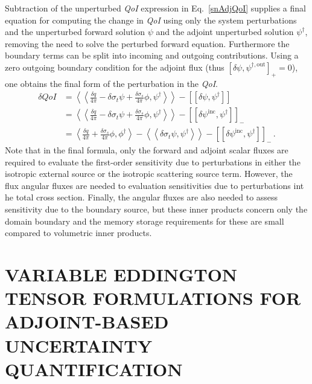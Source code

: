 \documentclass[12pt]{report}
\newcommand{\bra}{\left\langle}
\newcommand{\ket}{\right\rangle}
\newcommand{\braSN}{\left\langle \! \left\langle}
\newcommand{\ketSN}{\right\rangle \! \right\rangle}
\newcommand{\sbraSN}{\left[ \! \left[}
\newcommand{\sketSN}{\right] \! \right]}
\newcommand{\sbra}{\left[}
\newcommand{\sket}{\right]}
\newcommand{\sigt}{\sigma_t}
\newcommand{\sigs}{\sigma_s}
\newcommand{\angSourced}{\frac{\delta q}{4 \pi}}
\newcommand{\qoi}{{\it QoI}\xspace}
\begin{document}
Subtraction of the unperturbed \qoi expression in Eq.~\eqref{snAdjQoI} supplies a final equation for computing the change in \qoi using only the system perturbations and the unperturbed forward solution $\psi$ and the adjoint unperturbed
solution $\psi^\dag$, removing the need to solve the perturbed forward equation. 
Furthermore the boundary terms can be split into incoming and outgoing contributions.
Using a zero outgoing boundary condition for the adjoint flux
(thus $\sbra \delta \psi, \psi^{\dag,\text{out}} \sket_+=0$), one obtains the final 
form of the perturbation in the \qoi.
\begin{equation}
\label{snSens}
\begin{split}
\delta QoI &= \braSN \frac{\delta q}{4\pi} - \delta \sigt \psi + \frac{\delta\sigs}{4 \pi} \phi  , \psi^\dag  \ketSN - \sbraSN \delta \psi, \psi^\dag \sketSN \\
&= \braSN \angSourced - \delta \sigt \psi + \frac{\delta\sigs}{4 \pi} \phi , \psi^\dag  \ketSN - \sbraSN \delta \psi^{\text{inc}}, \psi^\dag \sketSN_- \\
&= \bra \angSourced  + \frac{\delta\sigs}{4 \pi} \phi , \phi^\dag  \ket - \braSN  \delta \sigt \psi , \psi^\dag \ketSN - \sbraSN \delta \psi^{\text{inc}}, \psi^\dag \sketSN_- \,.
\end{split}
\end{equation}
Note that in the final formula, only the forward and adjoint scalar fluxes
are required to evaluate the first-order sensitivity due to perturbations in either the isotropic external source or the isotropic scattering source term. However, the flux angular fluxes are needed to evaluation sensitivities due to
perturbations int he total cross section. Finally, the angular fluxes
are also needed to assess sensitivity due to the boundary source, but these inner
products concern only the domain boundary and the memory storage requirements for these are small compared to volumetric inner products.

\chapter{\uppercase {Variable Eddington Tensor Formulations For Adjoint-based Uncertainty Quantification}} \label{chap:VET}

\end{document}
